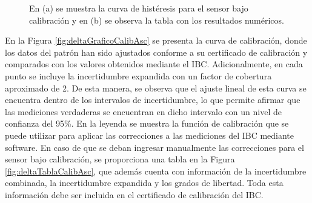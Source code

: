 \begin{figure}[H]
    \centering
    \begin{minipage}[b]{1\textwidth}
        \centering
    \end{minipage}  
    \hspace{1em} %
    \begin{minipage}[b]{0.55\textwidth}
        \centering
    \end{minipage}  
    \caption{En (a) se muestra la curva de histéresis para el sensor bajo calibración y en (b) se observa la tabla con los resultados numéricos.}
    \label{fig:deltaResultHisteresis}
\end{figure} 

En la Figura \ref{fig:deltaGraficoCalibAsc} se presenta la curva de calibración, donde los datos del patrón han sido ajustados conforme a su certificado de calibración y comparados con los valores obtenidos mediante el IBC. Adicionalmente, en cada punto se incluye la incertidumbre expandida con un factor de cobertura aproximado de 2. De esta manera, se observa que el ajuste lineal de esta curva se encuentra dentro de los intervalos de incertidumbre, lo que permite afirmar que las mediciones verdaderas se encuentran en dicho intervalo con un nivel de confianza del 95\%. En la leyenda se muestra la función de calibración que se puede utilizar para aplicar las correcciones a las mediciones del IBC mediante software. En caso de que se deban ingresar manualmente las correcciones para el sensor bajo calibración, se proporciona una tabla en la Figura \ref{fig:deltaTablaCalibAsc}, que además cuenta con información de la incertidumbre combinada, la incertidumbre expandida y los grados de libertad. Toda esta información debe ser incluida en el certificado de calibración del IBC.


